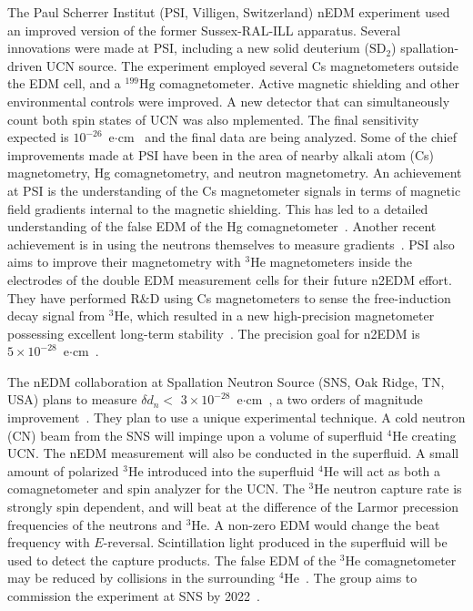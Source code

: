 The Paul Scherrer Institut (PSI, Villigen, Switzerland) nEDM experiment used an improved version of the former Sussex-RAL-ILL apparatus. Several innovations were made at PSI, including a new solid deuterium ($\mathrm{SD_2}$) spallation-driven UCN source. The experiment employed several Cs magnetometers outside the EDM cell, and a $^{199}\mathrm{Hg}$ comagnetometer. Active magnetic shielding and other environmental controls were improved. A new detector that can simultaneously count both spin states of UCN was also mplemented. The final sensitivity expected is $\mathrm{10^{-26}}$~e$\cdot$cm~\cite{psi} and the final data are being analyzed. Some of the chief improvements made at PSI have been in the area of nearby alkali atom (Cs) magnetometry, Hg comagnetometry, and neutron magnetometry. An achievement at PSI is the understanding of the Cs magnetometer signals in terms of magnetic field gradients internal to the magnetic shielding. This has led to a detailed understanding of the false EDM of the Hg comagnetometer~\cite{psi_falseEDM}. Another recent achievement is in using the neutrons themselves to measure gradients~\cite{psi_n_gradient}. PSI also aims to improve their magnetometry with $^3\mathrm{He}$ magnetometers inside the electrodes of the double EDM measurement cells for their future n2EDM effort. They have performed R$\&$D using Cs magnetometers to sense the free-induction decay signal from $^3\mathrm{He}$, which resulted in a new high-precision magnetometer possessing excellent long-term stability~\cite{psi_magnetometer}. The precision goal for n2EDM is $5 \times 10^{-28}$~e$\cdot$cm~\cite{psi_n2edm_nEDM-workshop,psi_n2edm_PPNS-workshop}.

The nEDM collaboration at Spallation Neutron Source (SNS, Oak Ridge, TN, USA) plans to measure $\delta d_n<$ $3\times10^{-28}$~e$\cdot$cm~\cite{sns_nEDM-workshop}, a two orders of magnitude improvement~\cite{sns_lim}. They plan to use a unique experimental technique. A cold neutron (CN) beam from the SNS will impinge upon a volume of superfluid $^4\mathrm{He}$ creating UCN. The nEDM measurement will also be conducted in the superfluid. A small amount of polarized $^3\mathrm{He}$ introduced into the superfluid $^4\mathrm{He}$ will act as both a comagnetometer and spin analyzer for the UCN. The $^3\mathrm{He}$ neutron capture rate is strongly spin dependent, and will beat at the difference of the Larmor precession frequencies of the neutrons and $^3\mathrm{He}$. A non-zero EDM would change the beat frequency with $E$-reversal. Scintillation light produced in the superfluid will be used to detect the capture products. The false EDM of the $^3\mathrm{He}$ comagnetometer may be reduced by collisions in the surrounding $^4\mathrm{He}$~\cite{sns_false_edm}. The group aims to commission the experiment at SNS by 2022~\cite{sns_nEDM-workshop}.


